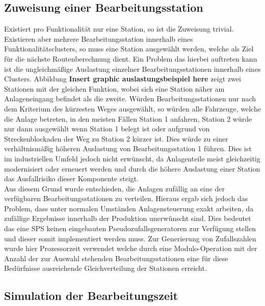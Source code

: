 		
		\subsection{Zuweisung einer Bearbeitungsstation}
			\label{Zuweisung_Station}
			Existiert pro Funktionalität nur eine Station, so ist die Zuweisung trivial. Existieren aber mehrere Bearbeitungsstation innerhalb eines Funktionalitätsclusters, so muss eine Station ausgewählt werden, welche als Ziel für die nächste Routenberechnung dient. Ein Problem das hierbei auftreten kann ist die ungleichmäßige Auslastung einzelner Bearbeitungsstationen innerhalb eines Clusters. Abbildung \textbf{Insert graphic auslastungsbeispiel here} zeigt zwei Stationen mit der gleichen Funktion, wobei sich eine Station näher am Anlageneingang befindet als die zweite. Würden Bearbeitungsstationen nur nach dem Kriterium des kürzesten Weges ausgewählt, so würden alle Fahrzeuge, welche die Anlage betreten, in den meisten Fällen Station 1 anfahren, Station 2 würde nur dann ausgewählt wenn Station 1 belegt ist oder aufgrund von Streckenblockaden der Weg zu Station 2 kürzer ist. Dies würde zu einer verhältnismäßig höheren Auslastung von Bearbeitungsstation 1 führen. Dies ist im industriellen Umfeld jedoch nicht erwünscht, da Anlagenteile meist gleichzeitig modernisiert oder erneuert werden und durch die höhere Auslastung einer Station das Ausfallrisiko dieser Komponente steigt.\\
			
			Aus diesem Grund wurde entschieden, die Anlagen zufällig an eine der verfügbaren Bearbeitungsstationen zu verteilen. Hieraus ergab sich jedoch das Problem, dass unter normalen Umständen Anlagensteuerung exakt arbeiten, da zufällige Ergebnisse innerhalb der Produktion unerwünscht sind. Dies bedeutet das eine \ac{SPS} keinen eingebauten Pseudozufallsgeneratoren zur Verfügung stellen und dieser somit implementiert werden muss. Zur Generierung von Zufallszahlen wurde hier Prozessorzeit verwendet welche durch eine Modulo-Operation mit der Anzahl der zur Auswahl stehenden Bearbeitungsstationen eine für diese Bedürfnisse ausreichende Gleichverteilung der Stationen erreicht.
		
		\subsection{Simulation der Bearbeitungszeit}
		

